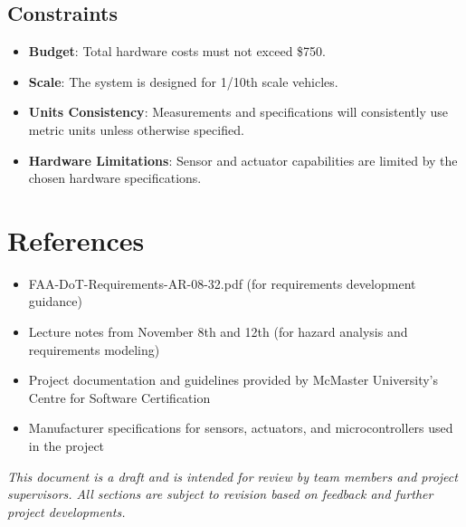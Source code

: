 \documentclass[12pt]{article}
\begin{document}
\subsection{Constraints}

\begin{itemize}
    \item \textbf{Budget}: Total hardware costs must not exceed \$750.
    \item \textbf{Scale}: The system is designed for 1/10th scale vehicles.
    \item \textbf{Units Consistency}: Measurements and specifications will consistently use metric units unless otherwise specified.
    \item \textbf{Hardware Limitations}: Sensor and actuator capabilities are limited by the chosen hardware specifications.
\end{itemize}

\section{References}

\begin{itemize}
    \item FAA-DoT-Requirements-AR-08-32.pdf (for requirements development guidance)
    \item Lecture notes from November 8th and 12th (for hazard analysis and requirements modeling)
    \item Project documentation and guidelines provided by McMaster University’s Centre for Software Certification
    \item Manufacturer specifications for sensors, actuators, and microcontrollers used in the project
\end{itemize}

\textit{This document is a draft and is intended for review by team members and project supervisors. All sections are subject to revision based on feedback and further project developments.}
\end{document}

